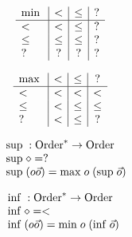 \newcommand{\mino}{\mathrm{min}\;}
\newcommand{\maxo}{\mathrm{max}\;}
\newcommand{\supo}{\mathrm{sup}\;}
\newcommand{\info}{\mathrm{inf}\;}

\begin{definition}
\[
\begin{array}{l | c |c | c}
 \mino &  <      &  \leq    & ? \\
\hline
  <    & <       &  \leq    &   ? \\
 \leq  & \leq    &  \leq    &   ?  \\
 ?     & ?       &  ?       &   ?
\end{array}
\]
\end{definition}

\begin{definition}
\[
\begin{array}{l | c |c | c}
 \maxo & <      &  \leq    &   ? \\
\hline
  <    & <       & <       &   <    \\
 \leq  & <       & \leq    &   \leq  \\
 ?     & <       & \leq    &   ?
\end{array}
\]
\end{definition}

\begin{definition}
\[
\begin{array}[t]{ll}
\multicolumn{2}{l}{\supo : \ves{\order} \ra \order}\\ 
\supo \diamond = ? \\
\supo (o \vec{o} ) = \maxo o \; (\supo \vec{o}) \\
\end{array}
\]
\end{definition}

\begin{definition}
\[
\begin{array}[t]{ll}
\multicolumn{2}{l}{\info : \ves{\order} \ra \order}\\ 
\info \diamond = < \\
\info (o \vec{o} ) = \mino o \; (\info \vec{o}) \\
\end{array}
\]
\end{definition}

\newcommand{\cmp}{\mathrm{cmp}\;}
\newcommand{\cmpv}{\mathrm{cmpv}}
\newcommand{\cmps}{\mathrm{cmps}}
\newcommand{\cmpsv}{\mathrm{cmpsv}}
\newcommand{\etp}{\mathrm{etp}\;}


